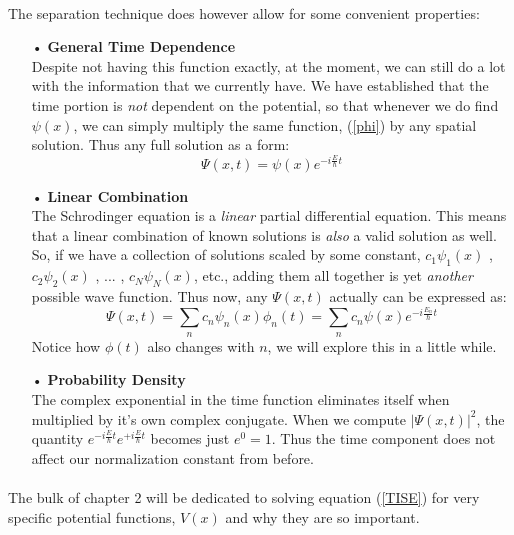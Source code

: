 \documentclass[12pt,letterpaper]{book}
\begin{document}
\paragraph*{}The separation technique does however allow for some convenient properties:

\begin{enumerate}
\item[•]\textbf{General Time Dependence}\\
Despite not having this function exactly, at the moment, we can still do a lot with the information that we currently have. We have established that the time portion is \textit{not} dependent on the potential, so that whenever we do find $\psi(x)$, we can simply multiply the same function, (\ref{phi}) by any spatial solution. Thus any full solution as a form:
\begin{equation}
\Psi(x,t) = \psi(x)e^{-i\frac{E}{\hbar}t}
\end{equation}
\item[•]\textbf{Linear Combination}\\
The Schrodinger equation is a \textit{linear} partial differential equation. This means that a linear combination of known solutions is \textit{also} a valid solution as well. So, if we have a collection of solutions scaled by some constant,
$c_1\psi_1(x)$ , $c_2\psi_2(x)$ , ... , $c_N\psi_N(x)$, etc., adding them all together is yet \textit{another} possible wave function. Thus now, any $\Psi(x,t)$ actually can be expressed as:
\begin{equation}
\label{linear combo}
\Psi(x,t) = \sum_n c_n \psi_n(x) \phi_n(t) = 
\sum_n c_n \psi(x) e^{-i\frac{E_n}{\hbar}t}
\end{equation}
Notice how $\phi(t)$ also changes with $n$, we will explore this in a little while. 
\item[•]\textbf{Probability Density}\\
The complex exponential in the time function eliminates itself when multiplied by it's own complex conjugate. When we compute $\big | \Psi(x,t) \big|^2$, the quantity $e^{-i\frac{E}{\hbar}t}e^{+i\frac{E}{\hbar}t}$ becomes just $e^0 = 1$. Thus the time component does not affect our normalization constant from before. 
\end{enumerate}

\paragraph*{}The bulk of chapter 2 will be dedicated to solving equation (\ref{TISE}) for very specific potential functions, $V(x)$ and why they are so important. 
\end{document}
